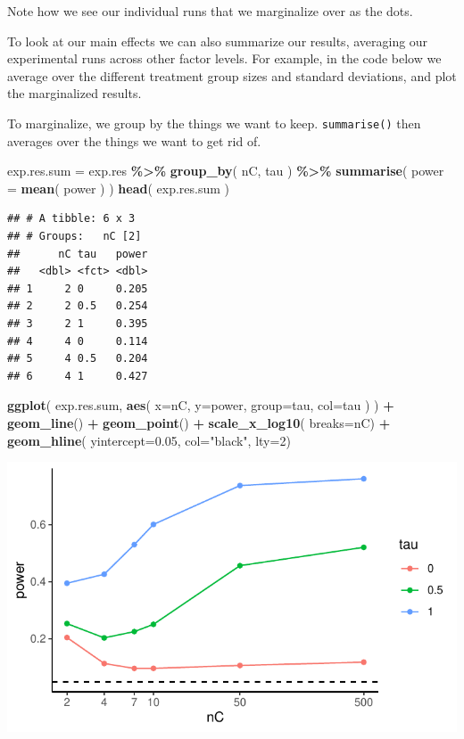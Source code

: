 \documentclass[
]{book}
\newenvironment{Shaded}{\begin{snugshade}}{\end{snugshade}}
\newcommand{\AttributeTok}[1]{\textcolor[rgb]{0.13,0.29,0.53}{#1}}
\newcommand{\DecValTok}[1]{\textcolor[rgb]{0.00,0.00,0.81}{#1}}
\newcommand{\FloatTok}[1]{\textcolor[rgb]{0.00,0.00,0.81}{#1}}
\newcommand{\FunctionTok}[1]{\textcolor[rgb]{0.13,0.29,0.53}{\textbf{#1}}}
\newcommand{\NormalTok}[1]{#1}
\newcommand{\OtherTok}[1]{\textcolor[rgb]{0.56,0.35,0.01}{#1}}
\newcommand{\SpecialCharTok}[1]{\textcolor[rgb]{0.81,0.36,0.00}{\textbf{#1}}}
\newcommand{\StringTok}[1]{\textcolor[rgb]{0.31,0.60,0.02}{#1}}
\begin{document}
Note how we see our individual runs that we marginalize over as the dots.

To look at our main effects we can also summarize our results, averaging our
experimental runs across other factor levels. For example, in the code below
we average over the different treatment group sizes and standard deviations,
and plot the marginalized results.

To marginalize, we group by the things we want to keep. \texttt{summarise()} then
averages over the things we want to get rid of.

\begin{Shaded}
\begin{Highlighting}[]
\NormalTok{exp.res.sum }\OtherTok{=}\NormalTok{ exp.res }\SpecialCharTok{\%\textgreater{}\%} \FunctionTok{group\_by}\NormalTok{( nC, tau ) }\SpecialCharTok{\%\textgreater{}\%}
  \FunctionTok{summarise}\NormalTok{( }\AttributeTok{power =} \FunctionTok{mean}\NormalTok{( power ) )}
\FunctionTok{head}\NormalTok{( exp.res.sum )}
\end{Highlighting}
\end{Shaded}

\begin{verbatim}
## # A tibble: 6 x 3
## # Groups:   nC [2]
##      nC tau   power
##   <dbl> <fct> <dbl>
## 1     2 0     0.205
## 2     2 0.5   0.254
## 3     2 1     0.395
## 4     4 0     0.114
## 5     4 0.5   0.204
## 6     4 1     0.427
\end{verbatim}

\begin{Shaded}
\begin{Highlighting}[]
\FunctionTok{ggplot}\NormalTok{( exp.res.sum, }\FunctionTok{aes}\NormalTok{( }\AttributeTok{x=}\NormalTok{nC, }\AttributeTok{y=}\NormalTok{power, }\AttributeTok{group=}\NormalTok{tau, }\AttributeTok{col=}\NormalTok{tau ) ) }\SpecialCharTok{+}
  \FunctionTok{geom\_line}\NormalTok{() }\SpecialCharTok{+} \FunctionTok{geom\_point}\NormalTok{() }\SpecialCharTok{+}
  \FunctionTok{scale\_x\_log10}\NormalTok{( }\AttributeTok{breaks=}\NormalTok{nC) }\SpecialCharTok{+}
  \FunctionTok{geom\_hline}\NormalTok{( }\AttributeTok{yintercept=}\FloatTok{0.05}\NormalTok{, }\AttributeTok{col=}\StringTok{"black"}\NormalTok{, }\AttributeTok{lty=}\DecValTok{2}\NormalTok{)}
\end{Highlighting}
\end{Shaded}

\begin{center}\includegraphics[width=0.75\linewidth]{Designing-Simulations-in-R_files/figure-latex/plotCollapse-1} \end{center}
\end{document}
